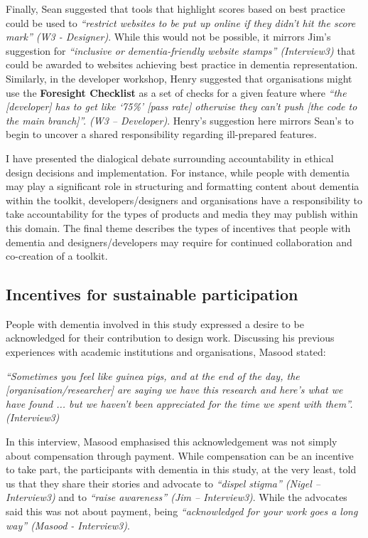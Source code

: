 Finally, Sean suggested that tools that highlight scores based on best practice could be used to \textit{``restrict websites to be put up online if they didn't hit the score mark'' (W3 - Designer)}. While this would not be possible, it mirrors Jim's suggestion for \textit{``inclusive or dementia-friendly website stamps'' (Interview3)} that could be awarded to websites achieving best practice in dementia representation. Similarly, in the developer workshop, Henry suggested that organisations might use the \textbf{Foresight Checklist} as a set of checks for a given feature where\textit{ ``the [developer] has to get like ‘75\%’ [pass rate] otherwise they can’t push [the code to the main branch]''. (W3 – Developer)}. Henry’s suggestion here mirrors Sean’s to begin to uncover a shared responsibility regarding ill-prepared features.

I have presented the dialogical debate surrounding accountability in ethical design decisions and implementation. For instance, while people with dementia may play a significant role in structuring and formatting content about dementia within the toolkit, developers/designers and organisations have a responsibility to take accountability for the types of products and media they may publish within this domain. The final theme describes the types of incentives that people with dementia and designers/developers may require for continued collaboration and co-creation of a toolkit.

\subsection{Incentives for sustainable participation}
People with dementia involved in this study expressed a desire to be acknowledged for their contribution to design work. Discussing his previous experiences with academic institutions and organisations, Masood stated:

\textit{``Sometimes you feel like guinea pigs, and at the end of the day, the [organisation/researcher] are saying we have this research and here's what we have found ... but we haven't been appreciated for the time we spent with them''. (Interview3)}

In this interview, Masood emphasised this acknowledgement was not simply about compensation through payment. While compensation can be an incentive to take part, the participants with dementia in this study, at the very least, told us that they share their stories and advocate to \textit{``dispel stigma'' (Nigel – Interview3)} and to \textit{``raise awareness'' (Jim – Interview3)}. While the advocates said this was not about payment, being \textit{``acknowledged for your work goes a long way'' (Masood - Interview3)}. 

